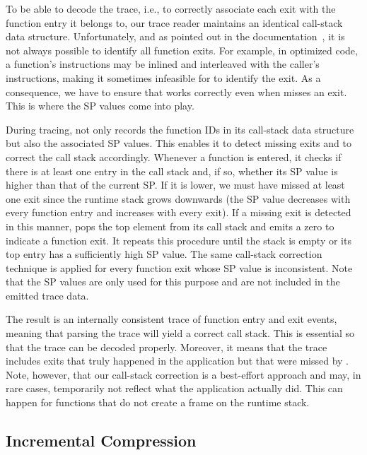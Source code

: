 To be able to decode the trace, i.e., to correctly associate each exit with the function entry it belongs to, our trace reader maintains an identical call-stack data structure. Unfortunately, and as pointed out in the \pin documentation~\cite{???}, it is not always possible to identify all function exits. For example, in optimized code, a function's instructions may be inlined and interleaved with the caller's instructions, making it sometimes infeasible for \pin to identify the exit. As a consequence, we have to ensure that \parlot works correctly even when \pin misses an exit. This is where the SP values come into play.

During tracing, \parlot not only records the function IDs in its call-stack data structure but also the associated SP values. This enables it to detect missing exits and to correct the call stack accordingly. Whenever a function is entered, it checks if there is at least one entry in the call stack and, if so, whether its SP value is higher than that of the current SP. If it is lower, we must have missed at least one exit since the runtime stack grows downwards (the SP value decreases with every function entry and increases with every exit). If a missing exit is detected in this manner, \parlot pops the top element from its call stack and emits a zero to indicate a function exit. It repeats this procedure until the stack is empty or its top entry has a sufficiently high SP value. The same call-stack correction technique is applied for every function exit whose SP value is inconsistent. Note that the SP values are only used for this purpose and are not included in the emitted trace data.

The result is an internally consistent trace of function entry and exit events, meaning that parsing the trace will yield a correct call stack. This is essential so that the trace can be decoded properly. Moreover, it means that the trace includes exits that truly happened in the application but that were missed by \pin. Note, however, that our call-stack correction is a best-effort approach and may, in rare cases, temporarily not reflect what the application actually did. This can happen for functions that do not create a frame on the runtime stack.


\subsection{Incremental Compression}
\label{sec:incr-compr}


